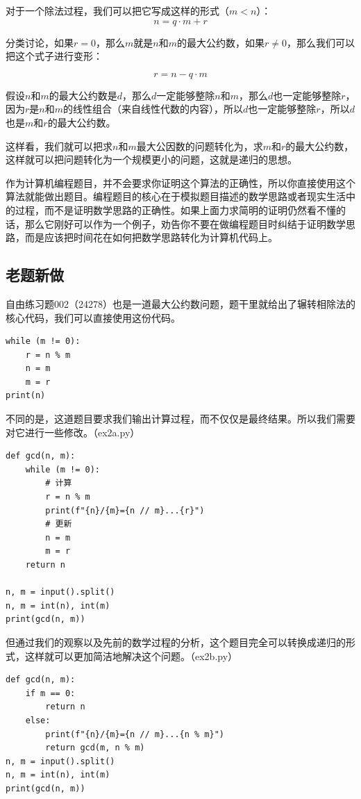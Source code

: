 \documentclass{article}
\begin{document}
对于一个除法过程，我们可以把它写成这样的形式（$m < n$）：
\begin{equation}
    n = q \cdot m + r
\end{equation}

分类讨论，如果$r=0$，那么$m$就是$n$和$m$的最大公约数，如果$r\neq 0$，那么我们可以把这个式子进行变形：

\begin{equation}
    r = n - q \cdot m
\end{equation}

假设$n$和$m$的最大公约数是$d$，那么$d$一定能够整除$n$和$m$，那么$d$也一定能够整除$r$，因为$r$是$n$和$m$的线性组合（来自线性代数的内容），所以$d$也一定能够整除$r$，所以$d$也是$m$和$r$的最大公约数。

这样看，我们就可以把求$n$和$m$最大公因数的问题转化为，求$m$和$r$的最大公约数，这样就可以把问题转化为一个规模更小的问题，这就是递归的思想。

作为计算机编程题目，并不会要求你证明这个算法的正确性，所以你直接使用这个算法就能做出题目。编程题目的核心在于模拟题目描述的数学思路或者现实生活中的过程，而不是证明数学思路的正确性。如果上面力求简明的证明仍然看不懂的话，那么它刚好可以作为一个例子，劝告你不要在做编程题目时纠结于证明数学思路，而是应该把时间花在如何把数学思路转化为计算机代码上。

\subsection{老题新做}

自由练习题002（24278）也是一道最大公约数问题，题干里就给出了辗转相除法的核心代码，我们可以直接使用这份代码。

\begin{lstlisting}
while (m != 0):
    r = n % m
    n = m
    m = r
print(n)
\end{lstlisting}

不同的是，这道题目要求我们输出计算过程，而不仅仅是最终结果。所以我们需要对它进行一些修改。（ex2a.py）

\begin{lstlisting}
def gcd(n, m):
    while (m != 0):
        # 计算
        r = n % m
        print(f"{n}/{m}={n // m}...{r}")
        # 更新
        n = m
        m = r
    return n

n, m = input().split()
n, m = int(n), int(m)
print(gcd(n, m))
\end{lstlisting}

但通过我们的观察以及先前的数学过程的分析，这个题目完全可以转换成递归的形式，这样就可以更加简洁地解决这个问题。（ex2b.py）
\begin{lstlisting}
def gcd(n, m):
    if m == 0:
        return n
    else:
        print(f"{n}/{m}={n // m}...{n % m}")
        return gcd(m, n % m)
n, m = input().split()
n, m = int(n), int(m)
print(gcd(n, m))
\end{lstlisting}
\end{document}
